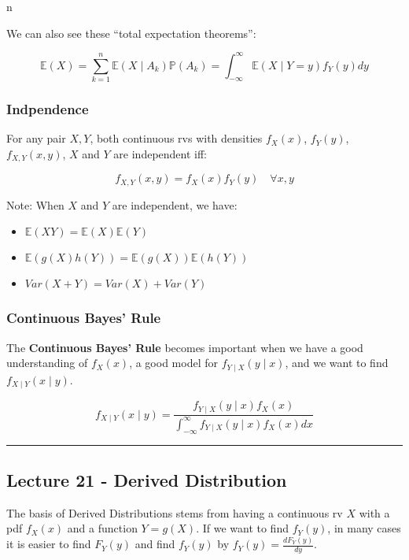 n\documentclass{article}
\begin{document}
We can also see these ``total expectation theorems'':

\[
  \mathbb{E}(X) = \sum_{k=1}^n \mathbb{E}(X\mid A_k)\mathbb{P}(A_k) =
  \int_{-\infty}^\infty \mathbb{E}(X\mid Y=y) f_Y(y) dy
\]

\subsubsection{Indpendence}

For any pair $X,Y$, both continuous rvs with densities $f_X(x)$,
$f_Y(y)$, $f_{X,Y}(x,y)$, $X$ and $Y$ are independent iff:

\begin{equation}
  \tag{Independence: Continuous}
  \boxed{
    f_{X,Y}(x,y) = f_X(x)f_Y(y) \quad \forall x, y
  }
\end{equation}

Note: When $X$ and $Y$ are independent, we have:

\begin{itemize}
\item $\mathbb{E}(XY) = \mathbb{E}(X)\mathbb{E}(Y)$
\item $\mathbb{E}(g(X)h(Y)) = \mathbb{E}(g(X))\mathbb{E}(h(Y))$
\item $Var(X+Y) = Var(X)+Var(Y)$
\end{itemize}

\subsubsection{Continuous Bayes' Rule}

The \textbf{Continuous Bayes' Rule} becomes important when we have a
good understanding of $f_X(x)$, a good model for $f_{Y\mid X}(y\mid
x)$, and we want to find $f_{X\mid Y}(x\mid y)$.

\begin{equation}
  \tag{Continuous Bayes' Rule}
  \boxed{
    f_{X\mid Y}(x\mid y) = \frac{f_{Y\mid X}(y\mid x)f_X(x)}
    {\int_{-\infty}^\infty f_{Y\mid X}(y\mid x) f_X(x) dx}
  }
\end{equation}

\medskip\hrule
\subsection{Lecture 21 - Derived Distribution}

The basis of Derived Distributions stems from having a continuous rv
$X$ with a pdf $f_X(x)$ and a function $Y=g(X)$. If we want to find
$f_Y(y)$, in many cases it is easier to find $F_Y(y)$ and find
$f_Y(y)$ by $f_Y(y) = \frac{dF_Y(y)}{dy}$.
\end{document}
